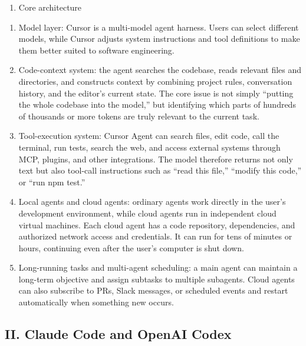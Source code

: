 \begin{enumerate}
\def\labelenumi{(\Roman{enumi})}
\setcounter{enumi}{1}
\tightlist
\item
  Core architecture
\end{enumerate}

\begin{enumerate}
\def\labelenumi{\arabic{enumi}.}
\item
  Model layer: Cursor is a multi-model agent harness. Users can select different models, while Cursor adjusts system instructions and tool definitions to make them better suited to software engineering.
\item
  Code-context system: the agent searches the codebase, reads relevant files and directories, and constructs context by combining project rules, conversation history, and the editor's current state. The core issue is not simply ``putting the whole codebase into the model,'' but identifying which parts of hundreds of thousands or more tokens are truly relevant to the current task.
\item
  Tool-execution system: Cursor Agent can search files, edit code, call the terminal, run tests, search the web, and access external systems through MCP, plugins, and other integrations. The model therefore returns not only text but also tool-call instructions such as ``read this file,'' ``modify this code,'' or ``run npm test.''
\item
  Local agents and cloud agents: ordinary agents work directly in the user's development environment, while cloud agents run in independent cloud virtual machines. Each cloud agent has a code repository, dependencies, and authorized network access and credentials. It can run for tens of minutes or hours, continuing even after the user's computer is shut down.
\item
  Long-running tasks and multi-agent scheduling: a main agent can maintain a long-term objective and assign subtasks to multiple subagents. Cloud agents can also subscribe to PRs, Slack messages, or scheduled events and restart automatically when something new occurs.
\end{enumerate}

\hypertarget{ii.-claude-code-and-openai-codex}{%
\subsection{II. Claude Code and OpenAI Codex}\label{ii.-claude-code-and-openai-codex}}

